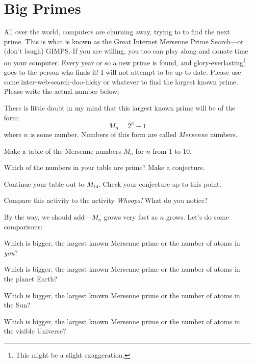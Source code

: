 \newpage
\activity\section{Big Primes}


All over the world, computers are churning away, trying to to find the
next prime. This is what is known as the Great Internet Mersenne Prime
Search---or (don't laugh) GIMPS. If you are willing, you
too can play along and donate time on your computer. Every year or so
a new prime is found, and glory-everlasting\footnote{This might be a
slight exaggeration.} goes to the person who finds it! I will not
attempt to be up to date. Please use some inter-web-search-doo-hicky
or whatever to find the largest known prime. Please write the actual
number below:

\vspace{1in}

There is little doubt in my mind that this largest known prime will be
of the form:
\[
M_n = 2^n -1
\]
where $n$ is some number. Numbers of this form are
called \textit{Mersenne} numbers.

\begin{prob} 
Make a table of the Mersenne numbers $M_n$ for $n$ from $1$ to $10$. 
\end{prob}

\begin{prob} 
Which of the numbers in your table are prime? Make a conjecture.
\end{prob}

\begin{prob} 
Continue your table out to $M_{14}$. Check your conjecture up to this
point.
\end{prob}


\begin{prob} 
Compare this activity to the activity \textit{Whoops!} What do you
notice?
\end{prob}


By the way, we should add---$M_{n}$ grows very fast as $n$
grows. Let's do some comparisons:

\begin{prob} 
Which is bigger, the largest known Mersenne prime or the number of atoms
in \textit{you}?
\end{prob}

\begin{prob} 
Which is bigger, the largest known Mersenne prime or the number of
atoms in the planet Earth?
\end{prob}

\begin{prob} 
Which is bigger, the largest known Mersenne prime or the number of
atoms in the Sun?
\end{prob}

\begin{prob} 
Which is bigger, the largest known Mersenne prime or the number of
atoms in the visible Universe?
\end{prob}


